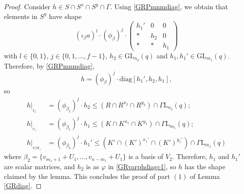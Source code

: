 \documentclass[a4paper,reqno,11pt]{amsart}
\theoremstyle{definition}
\theoremstyle{remark}
\numberwithin{equation}{section}
\newcommand{\diag}{\mathrm{diag}}
\newcommand{\GaL}{{\Gamma \mathrm{L}}}
\newcommand{\GL}{{\mathrm{GL}}}
\begin{document}
\begin{proof}
Consider $h \in S \cap S^x \cap S^y \cap \Gamma.$ Using \eqref{GRPmnmdiag}, we obtain that elements in $S^y$ have shape 
\begin{equation}
\label{GRSy}
(\iota_{\beta} a)^l \cdot (\phi_{\beta})^j \cdot 
\begin{pmatrix}
h_1' & 0 & 0\\
 *   & h_2 & 0\\
 *   & * & h_1
\end{pmatrix}
\end{equation}
with $l \in \{0,1\}$, $j \in \{0, 1, \ldots, f-1\}$, $h_2 \in \GL_{n_2}(q)$ and $h_1, h_1' \in \GL_{m_1}(q).$ Therefore,  
by \eqref{GRPmnmdiag},
$$h= (\phi_{\beta})^j \cdot \diag[h_1',h_2,h_1],$$ so
\begin{align*}
h|_{_{V_2}} & =(\phi_{\beta_2})^j \cdot h_2 \le (R \cap R^{x_2} \cap R^{y_2}) \cap \GaL_{n_2}(q);\\  
h|_{_{U_1}} & =(\phi_{\beta_1})^j \cdot h_1 \le (K \cap K^{x_1} \cap K^{y_1}) \cap \GaL_{m_1}(q);\\
h|_{_{V/W_1}} & =(\phi_{\beta_3})^j \cdot h_1' \le (K' \cap (K')^{x_1'} \cap (K')^{y_1'}) \cap \GaL_{m_1}(q)
\end{align*} 
where $\beta_2=\{v_{m_1+1} +U_1, \ldots, v_{n-m_1}+U_1\}$ is a basis of $V_2.$ Therefore, $h_1$ and $h_1'$ are scalar matrices, and  $h_2$ is as $\varphi$ in \eqref{GRvarphdiagc1}, so $h$ has the shape claimed by the lemma.
 This concludes the proof of part $(1)$ of Lemma \ref{GRdiag}.

\bigskip


\end{proof}
\end{document}
